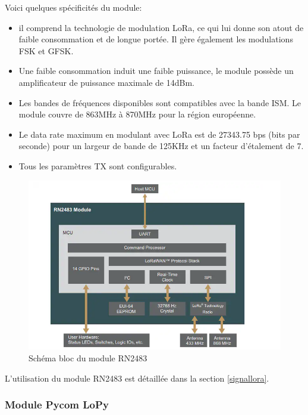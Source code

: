 Voici quelques spécificités du module:
\vspace{0.1cm}

\begin{itemize}
\item il comprend la technologie de modulation \ac{LoRa}, ce qui lui donne son atout de faible consommation et de longue portée. Il gère également les modulations \ac{FSK} et \ac{GFSK}.
\item Une faible consommation induit une faible puissance, le module possède un amplificateur de puissance maximale de 14dBm.
\item Les bandes de fréquences disponibles sont compatibles avec la bande \ac{ISM}. Le module couvre de 863MHz à 870MHz pour la région européenne.
\item Le data rate maximum en modulant avec LoRa est de 27343.75 bps (bits par seconde) pour un largeur de bande de 125KHz et un facteur d'étalement de 7.
\item Tous les paramètres TX sont configurables.
\end{itemize}


\begin{figure}[h]
\centering

\includegraphics[scale=0.8]{images/SBrn2483.png}
\caption{Schéma bloc du module RN2483}\label{term3002}
\end{figure}

L'utilisation du module RN2483 est détaillée dans la section \ref{signallora}.

\subsubsection{Module Pycom LoPy}




